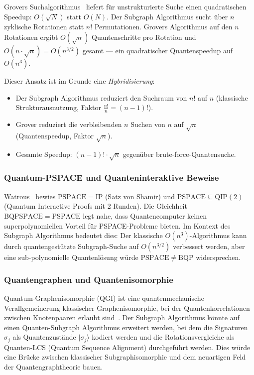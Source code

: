 ﻿\documentclass[a4paper,12pt]{article}
\theoremstyle{definition}
\begin{document}
Grovers Suchalgorithmus~\cite{grover1996fast} liefert für unstrukturierte Suche
einen quadratischen Speedup: $O(\sqrt{N})$ statt $O(N)$.
Der Subgraph Algorithmus sucht über $n$ zyklische Rotationen statt $n!$ Permutationen.
Grovers Algorithmus auf den $n$ Rotationen ergibt $O(\sqrt{n})$ Quantenschritte
pro Rotation und $O(n \cdot \sqrt{n}) = O(n^{3/2})$ gesamt --- ein quadratischer
Quantenspeedup auf $O(n^3)$.

Dieser Ansatz ist im Grunde eine \emph{Hybridisierung}:
\begin{itemize}
  \item Der Subgraph Algorithmus reduziert den Suchraum von $n!$ auf $n$
        (klassische Strukturausnutzung, Faktor $\frac{n!}{n} = (n-1)!$).
  \item Grover reduziert die verbleibenden $n$ Suchen von $n$ auf $\sqrt{n}$
        (Quantenspeedup, Faktor $\sqrt{n}$).
  \item Gesamte Speedup: $(n-1)! \cdot \sqrt{n}$ gegenüber brute-force-Quantensuche.
\end{itemize}

\subsubsection{Quantum-PSPACE und Quanteninteraktive Beweise}

Watrous~\cite{watrous2003pspace} bewies $\mathrm{PSPACE} = \mathrm{IP}$
(Satz von Shamir) und $\mathrm{PSPACE} \subseteq \mathrm{QIP}(2)$
(Quantum Interactive Proofs mit 2 Runden).
Die Gleichheit $\mathrm{BQPSPACE} = \mathrm{PSPACE}$ legt nahe,
dass Quantencomputer keinen superpolynomiellen Vorteil für PSPACE-Probleme
bieten. Im Kontext des Subgraph Algorithmus bedeutet dies:
Der klassische $O(n^3)$-Algorithmus kann durch quantengestützte Subgraph-Suche
auf $O(n^{3/2})$ verbessert werden, aber eine sub-polynomielle Quantenlösung
würde $\mathrm{PSPACE} \neq \mathrm{BQP}$ widersprechen.

\subsubsection{Quantengraphen und Quantenisomorphie}

Quantum-Graphenisomorphie (QGI) ist eine quantenmechanische Verallgemeinerung
klassischer Graphenisomorphie, bei der Quantenkorrelationen zwischen Knotenpaaren
erlaubt sind~\cite{mancinska2019quantum}.
Der Subgraph Algorithmus könnte auf einen Quanten-Subgraph Algorithmus erweitert werden,
bei dem die Signaturen $\sigma_j$ als Quantenzustände $|\sigma_j\rangle$ kodiert werden
und die Rotationsvergleiche als Quanten-LCS (Quantum Sequence Alignment) durchgeführt werden.
Dies würde eine Brücke zwischen klassischer Subgraphisomorphie und dem neuartigen Feld
der Quantengraphtheorie bauen.
\end{document}
